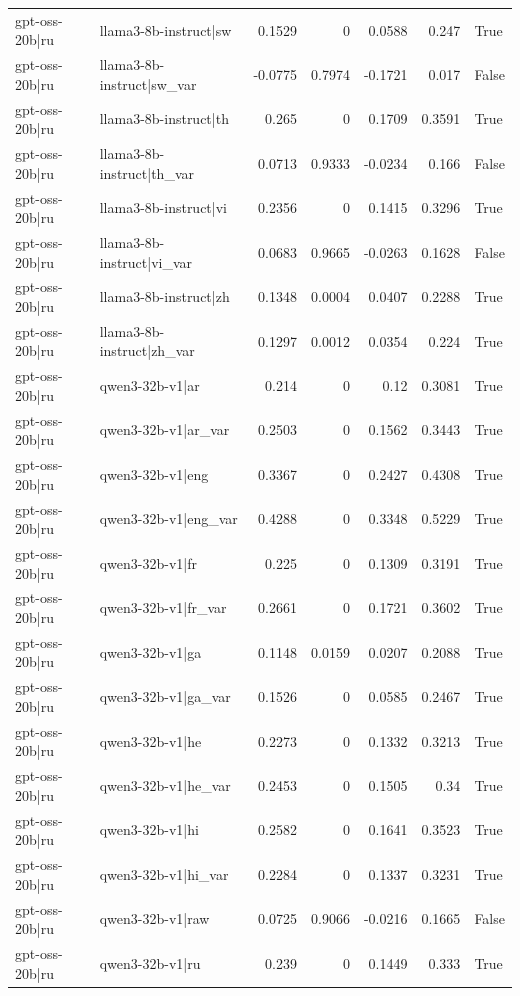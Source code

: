 \begin{table}
\begin{tabular}{l l r r r r l}
gpt-oss-20b|ru & llama3-8b-instruct|sw & 0.1529 & 0 & 0.0588 & 0.247 & True \\
gpt-oss-20b|ru & llama3-8b-instruct|sw_var & -0.0775 & 0.7974 & -0.1721 & 0.017 & False \\
gpt-oss-20b|ru & llama3-8b-instruct|th & 0.265 & 0 & 0.1709 & 0.3591 & True \\
gpt-oss-20b|ru & llama3-8b-instruct|th_var & 0.0713 & 0.9333 & -0.0234 & 0.166 & False \\
gpt-oss-20b|ru & llama3-8b-instruct|vi & 0.2356 & 0 & 0.1415 & 0.3296 & True \\
gpt-oss-20b|ru & llama3-8b-instruct|vi_var & 0.0683 & 0.9665 & -0.0263 & 0.1628 & False \\
gpt-oss-20b|ru & llama3-8b-instruct|zh & 0.1348 & 0.0004 & 0.0407 & 0.2288 & True \\
gpt-oss-20b|ru & llama3-8b-instruct|zh_var & 0.1297 & 0.0012 & 0.0354 & 0.224 & True \\
gpt-oss-20b|ru & qwen3-32b-v1|ar & 0.214 & 0 & 0.12 & 0.3081 & True \\
gpt-oss-20b|ru & qwen3-32b-v1|ar_var & 0.2503 & 0 & 0.1562 & 0.3443 & True \\
gpt-oss-20b|ru & qwen3-32b-v1|eng & 0.3367 & 0 & 0.2427 & 0.4308 & True \\
gpt-oss-20b|ru & qwen3-32b-v1|eng_var & 0.4288 & 0 & 0.3348 & 0.5229 & True \\
gpt-oss-20b|ru & qwen3-32b-v1|fr & 0.225 & 0 & 0.1309 & 0.3191 & True \\
gpt-oss-20b|ru & qwen3-32b-v1|fr_var & 0.2661 & 0 & 0.1721 & 0.3602 & True \\
gpt-oss-20b|ru & qwen3-32b-v1|ga & 0.1148 & 0.0159 & 0.0207 & 0.2088 & True \\
gpt-oss-20b|ru & qwen3-32b-v1|ga_var & 0.1526 & 0 & 0.0585 & 0.2467 & True \\
gpt-oss-20b|ru & qwen3-32b-v1|he & 0.2273 & 0 & 0.1332 & 0.3213 & True \\
gpt-oss-20b|ru & qwen3-32b-v1|he_var & 0.2453 & 0 & 0.1505 & 0.34 & True \\
gpt-oss-20b|ru & qwen3-32b-v1|hi & 0.2582 & 0 & 0.1641 & 0.3523 & True \\
gpt-oss-20b|ru & qwen3-32b-v1|hi_var & 0.2284 & 0 & 0.1337 & 0.3231 & True \\
gpt-oss-20b|ru & qwen3-32b-v1|raw & 0.0725 & 0.9066 & -0.0216 & 0.1665 & False \\
gpt-oss-20b|ru & qwen3-32b-v1|ru & 0.239 & 0 & 0.1449 & 0.333 & True \\

\end{tabular}
\end{table}

